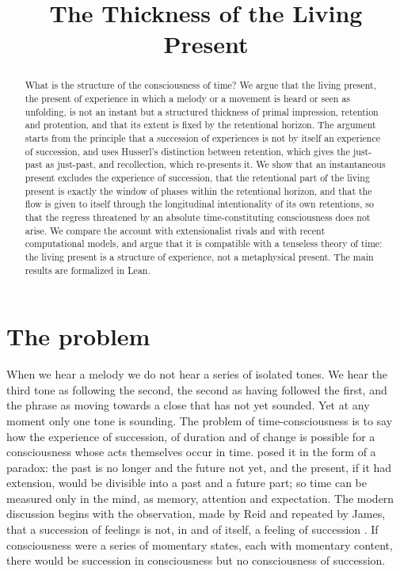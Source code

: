 \documentclass{situationist-preprint}
\title{The Thickness of the Living Present}
\begin{document}
\maketitle

\begin{abstract}
What is the structure of the consciousness of time? We argue that the living present, the present of experience in which a melody or a movement is heard or seen as unfolding, is not an instant but a structured thickness of primal impression, retention and protention, and that its extent is fixed by the retentional horizon. The argument starts from the principle that a succession of experiences is not by itself an experience of succession, and uses Husserl's distinction between retention, which gives the just-past as just-past, and recollection, which re-presents it. We show that an instantaneous present excludes the experience of succession, that the retentional part of the living present is exactly the window of phases within the retentional horizon, and that the flow is given to itself through the longitudinal intentionality of its own retentions, so that the regress threatened by an absolute time-constituting consciousness does not arise. We compare the account with extensionalist rivals and with recent computational models, and argue that it is compatible with a tenseless theory of time: the living present is a structure of experience, not a metaphysical present. The main results are formalized in Lean.
\end{abstract}

\section{The problem}

When we hear a melody we do not hear a series of isolated tones. We hear the third tone as following the second, the second as having followed the first, and the phrase as moving towards a close that has not yet sounded. Yet at any moment only one tone is sounding. The problem of time-consciousness is to say how the experience of succession, of duration and of change is possible for a consciousness whose acts themselves occur in time. \citet[XI.20--28]{Augustine} posed it in the form of a paradox: the past is no longer and the future not yet, and the present, if it had extension, would be divisible into a past and a future part; so time can be measured only in the mind, as memory, attention and expectation. The modern discussion begins with the observation, made by Reid and repeated by James, that a succession of feelings is not, in and of itself, a feeling of succession \citep[ch.~15]{James1890}. If consciousness were a series of momentary states, each with momentary content, there would be succession in consciousness but no consciousness of succession.
\end{document}

